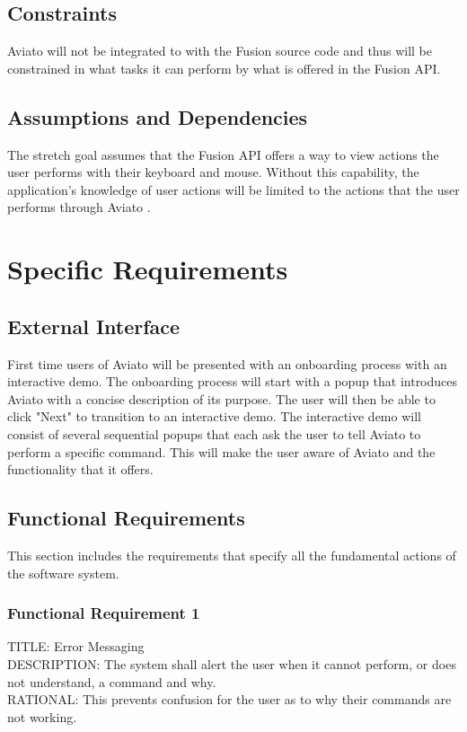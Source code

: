 \documentclass[onecolumn, draftclsnofoot,10pt, compsoc]{IEEEtran}
\def \botname{Aviato }
\begin{document}
    \subsection{Constraints}
        \botname will not be integrated to with the Fusion source code and thus will be constrained in what tasks it can perform by what is offered in the Fusion API. 

    \subsection{Assumptions and Dependencies}
        The stretch goal assumes that the Fusion API offers a way to view actions the user performs with their keyboard and mouse.
        Without this capability, the application's knowledge of user actions will be limited to the actions that the user performs through \botname.

\section{Specific Requirements}
    \subsection{External Interface}
       First time users of \botname will be presented with an onboarding process with an interactive demo.
       The onboarding process will start with a popup that introduces \botname with a concise description of its purpose.
       The user will then be able to click "Next" to transition to an interactive demo.
       The interactive demo will consist of several sequential popups that each ask the user to tell \botname to perform a specific command.
       This will make the user aware of \botname and the functionality that it offers.

    \subsection{Functional Requirements}
    This section includes the requirements that specify all the fundamental actions of the software system.
        \subsubsection{Functional Requirement 1}
        TITLE: Error Messaging \\
        DESCRIPTION: The system shall alert the user when it cannot perform, or does not understand, a command and why. \\
        RATIONAL: This prevents confusion for the user as to why their commands are not working. 
        
\end{document}
